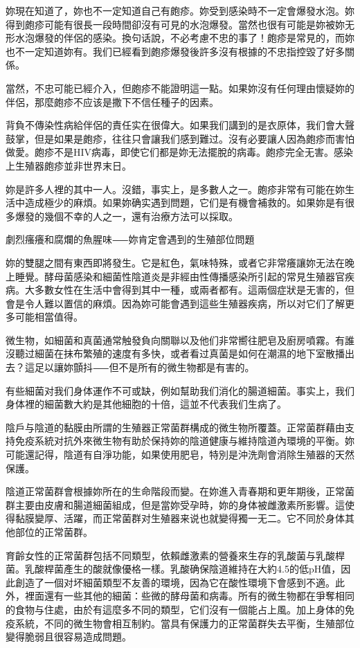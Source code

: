 \documentclass[12pt,UTF8]{ctexbook}
\begin{document}
妳現在知道了，妳也不一定知道自己有皰疹。妳受到感染時不一定會爆發水泡。妳得到皰疹可能有很長一段時間卻沒有可見的水泡爆發。當然也很有可能是妳被妳无形水泡爆發的伴侶的感染。換句话說，不必考慮不忠的事了！皰疹是常見的，而妳也不一定知道妳有。我们已經看到皰疹爆發後許多沒有根據的不忠指控毀了好多關係。

當然，不忠可能已經介入，但皰疹不能證明這一點。如果妳沒有任何理由懷疑妳的伴侶，那麼皰疹不应该是撒下不信任種子的因素。

背負不傳染性病給伴侶的責任实在很偉大。如果我们講到的是衣原体，我们會大聲鼓掌，但是如果是皰疹，往往只會讓我们感到難过。沒有必要讓人因為皰疹而害怕做愛。皰疹不是HIV病毒，即使它们都是妳无法擺脫的病毒。皰疹完全无害。感染上生殖器皰疹並非世界末日。

妳是許多人裡的其中一人。沒錯，事实上，是多數人之一。皰疹非常有可能在妳生活中造成極少的麻煩。如果妳确实遇到問題，它们是有機會補救的。如果妳是有很多爆發的幾個不幸的人之一，還有治療方法可以採取。





劇烈瘙癢和腐爛的魚腥味⸺妳肯定會遇到的生殖部位問題




妳的雙腿之間有東西即將發生。它是紅色，氣味特殊，或者它非常癢讓妳无法在晚上睡覺。酵母菌感染和細菌性陰道炎是非經由性傳播感染所引起的常見生殖器官疾病。大多數女性在生活中會得到其中一種，或兩者都有。這兩個症狀是无害的，但會是令人難以置信的麻煩。因為妳可能會遇到這些生殖器疾病，所以对它们了解更多可能相當值得。

微生物，如細菌和真菌通常触發負向關聯以及他们非常嚮往肥皂及廚房噴霧。有誰沒聽过細菌在抹布繁殖的速度有多快，或者看过真菌是如何在潮濕的地下室散播出去？這足以讓妳顫抖⸺但不是所有的微生物都是有害的。

有些細菌对我们身体運作不可或缺，例如幫助我们消化的腸道細菌。事实上，我们身体裡的細菌數大約是其他細胞的十倍，這並不代表我们生病了。

陰戶与陰道的黏膜由所謂的生殖器正常菌群構成的微生物所覆蓋。正常菌群藉由支持免疫系統对抗外來微生物有助於保持妳的陰道健康与維持陰道內環境的平衡。妳可能還記得，陰道有自淨功能，如果使用肥皂，特別是沖洗劑會消除生殖器的天然保護。

陰道正常菌群會根據妳所在的生命階段而變。在妳進入青春期和更年期後，正常菌群主要由皮膚和腸道細菌組成，但是當妳受孕時，妳的身体被雌激素所影響。這使得黏膜變厚、活躍，而正常菌群对生殖器来说也就變得獨一无二。它不同於身体其他部位的正常菌群。

育齡女性的正常菌群包括不同類型，依賴雌激素的營養來生存的乳酸菌与乳酸桿菌。乳酸桿菌產生的酸就像優格一樣。乳酸确保陰道維持在大約4.5的低pH值，因此創造了一個对坏細菌類型不友善的環境，因為它在酸性環境下會感到不適。此外，裡面還有一些其他的細菌：些微的酵母菌和病毒。所有的微生物都在爭奪相同的食物与住處，由於有這麼多不同的類型，它们沒有一個能占上風。加上身体的免疫系統，不同的微生物會相互制約。當具有保護力的正常菌群失去平衡，生殖部位變得脆弱且很容易造成問題。
\end{document}
